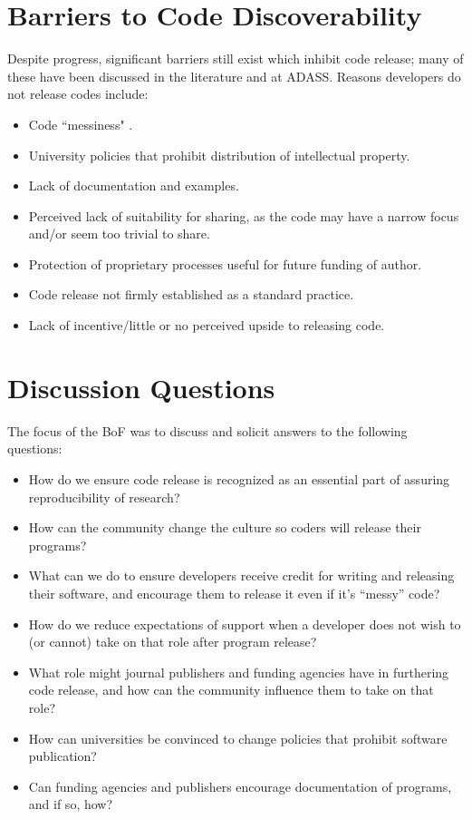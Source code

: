 \section{Barriers to Code Discoverability}

Despite progress, significant barriers still exist which inhibit code release; many of these have been discussed in the literature and at ADASS. Reasons developers do not release codes include:

\begin{itemize}
\item Code ``messiness" \citep{barnes2010}.
\item University policies that prohibit distribution of intellectual property.
\item Lack of documentation and examples.
\item Perceived lack of suitability for sharing, as the code may have a narrow focus and/or seem too trivial to share.
\item Protection of proprietary processes useful for future funding of author.
\item Code release not firmly established as a standard practice.
\item Lack of incentive/little or no perceived upside to releasing code.
\end{itemize}

\section{Discussion Questions}

The focus of the BoF was to discuss and solicit answers to the following questions:

\begin{itemize}
\item How do we ensure code release is recognized as an essential part of assuring reproducibility of research?
\item How can the community change the culture so coders will release their programs?
\item What can we do to ensure developers receive credit for writing and releasing their software, and encourage them to release it even if it's ``messy'' code?
\item How do we reduce expectations of support when a developer does not wish to (or cannot) take on that role after program release?
\item What role might journal publishers and funding agencies have in furthering code release, and how can the community influence them to take on that role?
\item How can universities be convinced to change policies that prohibit software publication?
\item Can funding agencies and publishers encourage documentation of programs, and if so, how?
\end{itemize}

